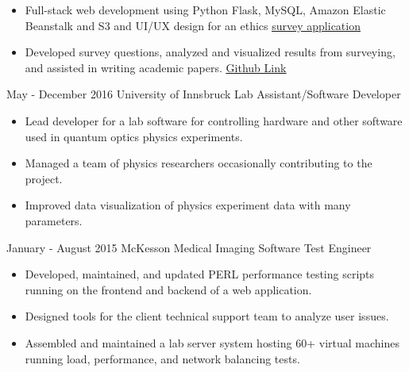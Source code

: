 \documentclass{tccv}
\begin{document}
    \begin{itemize}
        \setlength{\itemsep}{1pt}
        \setlength{\parsep}{0pt}
        \item Full-stack web development using Python Flask, MySQL, Amazon Elastic Beanstalk and S3 and UI/UX design for an ethics \href{www.your-views.org}{\underline{survey application}}
        \item Developed survey questions, analyzed and visualized results from surveying, and assisted in writing academic papers. \href{https://github.com/TylerJamesMalloy/NReasonsLab}{\underline{Github Link}}
    \end{itemize}
    
    \begin{eventlist}
    \item{May - December 2016}
         {University of Innsbruck}
         {Lab Assistant/Software Developer}
    \end{eventlist}
    
    \begin{itemize}
        \setlength{\itemsep}{1pt}
        \setlength{\parsep}{0pt}
        \item Lead developer for a lab software for controlling hardware and other software used in quantum optics physics experiments. 
        \item Managed a team of physics researchers occasionally contributing to the project.
        \item Improved data visualization of physics experiment data with many parameters.
    \end{itemize}
    
    \begin{eventlist}
    \item{January - August 2015}
         {McKesson Medical Imaging}
         {Software Test Engineer}
    \end{eventlist}
    
    \begin{itemize}
        \setlength{\itemsep}{1pt}
        \setlength{\parsep}{0pt}
        \item Developed, maintained, and updated PERL performance testing scripts running on the frontend and backend of a web application. 
        \item	Designed tools for the client technical support team to analyze user issues. 
        \item	Assembled and maintained a lab server system hosting 60+ virtual machines running load, performance, and network balancing tests. 
    
    \end{itemize}
    
\end{document}
